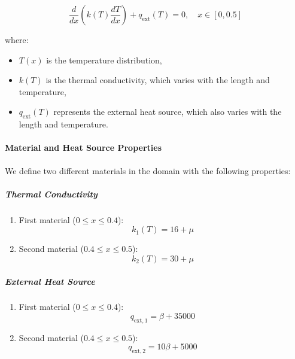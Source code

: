 \documentclass{article}
\begin{document}
	\begin{equation}
		\frac{d}{dx} \left( k(T) \frac{dT}{dx} \right) + q_{\text{ext}}(T) = 0, \quad x \in [0, 0.5]
	\end{equation}
	
	where:
	\begin{itemize}
		\item \( T(x) \) is the temperature distribution,
		\item \( k(T) \) is the thermal conductivity, which varies with the length and temperature,
		\item \( q_{\text{ext}}(T) \) represents the external heat source, which also varies with the length and temperature.
	\end{itemize}
	
	\paragraph{Material and Heat Source Properties}
	We define two different materials in the domain with the following properties:
	
	\subparagraph{Thermal Conductivity}
	\begin{enumerate}
		\item First material ($0\leq x\leq0.4$):
		\begin{equation}
			k_1(T) = 16 + \mu 
		\end{equation}
		\item Second material ($0.4\leq x\leq0.5$):
		\begin{equation}
			k_2(T) = 30 + \mu
		\end{equation}
	\end{enumerate}
	
	\subparagraph{External Heat Source}
	\begin{enumerate}
		\item First material ($0\leq x\leq0.4$):
		\begin{equation}
			q_{\text{ext},1} = \beta + 35000 
		\end{equation}
		\item Second material ($0.4\leq x\leq0.5$):
		\begin{equation}
			q_{\text{ext},2} = 10\beta + 5000
		\end{equation}
	\end{enumerate}
	
\end{document}
